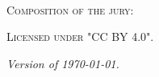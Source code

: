 \newpage
\thispagestyle{empty}
\setlength{\parindent}{0pt}
\setlength{\parskip}{\baselineskip}
\begin{fullwidth}
	~\vfill
	\begin{center}
		\normalfont\Large\scshape Composition of the jury:\\[1.5em]
		\normalfont
	\end{center}

	\vfill

	\par\textsc{Licensed under "CC BY 4.0".}
	\par\textit{Version of \today.}
\end{fullwidth}